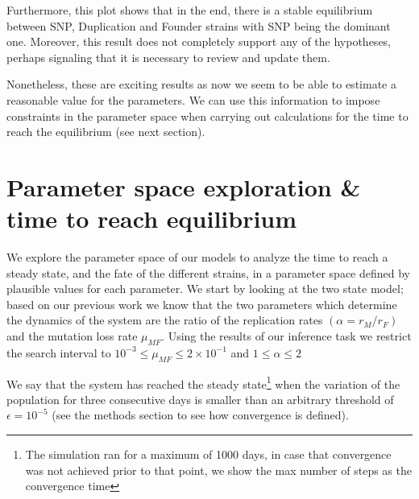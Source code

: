 \documentclass[10pt,a4paper]{scrartcl}
\begin{document}
Furthermore, this plot shows that in the end, there is a stable equilibrium between SNP, Duplication and Founder strains with SNP being the dominant one. Moreover, this result does not completely support any of the hypotheses, perhaps signaling that it is necessary to review and update them.%

Nonetheless, these are exciting results as now we seem to be able to estimate a reasonable value for the parameters. We can use this information to impose constraints in the parameter space when carrying out calculations for the time to reach the equilibrium (see next section).


\section{Parameter space exploration \& time to reach equilibrium}

We explore the parameter space of our models to analyze the time to reach a steady state, and the fate of the different strains, in a parameter space defined by plausible values for each parameter. We start by looking at the two state model; based on our previous work we know that the two parameters which determine the dynamics of the system are the ratio of the replication rates $(\alpha = r_M / r_F)$ and the mutation loss rate $\mu_{MF}$. Using the results of our inference task we restrict the search interval to $10^{-3} \leq \mu_{MF} \leq 2 \times 10^{-1}$ and $1 \leq \alpha \leq 2$

We say that the system has reached the steady state\footnote{The simulation ran for a maximum of 1000 days, in case that convergence was not achieved prior to that point, we show the max number of steps as the convergence time} when the variation of the population for three consecutive days is smaller than an arbitrary threshold of $\epsilon = 10^{-5}$ (see the methods section to see how convergence is defined).
\end{document}
